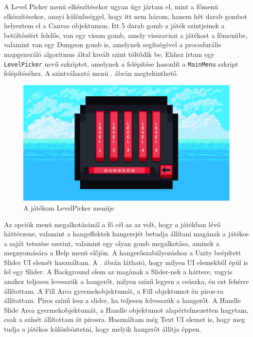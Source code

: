 
A Level Picker menü elkészítésekor ugyan úgy jártam el, mint a főmenü elkészítésekor, annyi különbséggel, hogy itt nem három, hanem hét darab gombot helyeztem el a Canvas objektumon. Itt 5 darab gomb a játék szintjeinek a betöltéséért felelős, van egy vissza gomb, amely visszaviszi a játékost a főmenübe, valamint van egy Dungeon gomb is, amelynek segítségével a procedurális mapgeneráló algoritmus által kreált szint töltődik be. Ehhez írtam egy \texttt{LevelPicker} nevű szkriptet, amelynek a felépítése hasonlít a \texttt{MainMenu} szkript felépítéséhez. A szintválasztó menü . ábrán megtekinthető.

\begin{figure}[ht]
\centering
\includegraphics[scale = 0.4]{images/levelpicker.png}
\caption{A játékom LevelPicker menüje}
\label{fig:levelpicker}
\end{figure}


Az opciók menü megalkotásánál a fő cél az az volt, hogy a játékban lévő háttérzene, valamint a hangeffektek hangerejét betudja állítani magának a játékos a saját tetszése szerint, valamint egy olyan gomb megalkotása, aminek a megnyomására a Help menü előjön. A hangerőszabályozáshoz a Unity beépített Slider UI elemét használtam. A . ábrán látható, hogy milyen UI elemekből épül is fel egy Slider. A Background elem az magának a Slider-nek a háttere, vagyis amikor teljesen levesszük a hangerőt, milyen színű legyen a csúszka, én ezt fehérre állítottam. A Fill Area gyermekobjektumát, a Fill objektumot én piros-ra állítottam. Piros színű lesz a slider, ha teljesen felvesszük a hangerőt. A Handle Slide Area gyermekobjektumát, a Handle objektumot alapértelmezetten hagytam, csak a színét állítottam át pirosra. Használtam még Text UI elemet is, hogy meg tudja a játékos különböztetni, hogy melyik hangerőt állítja éppen.

